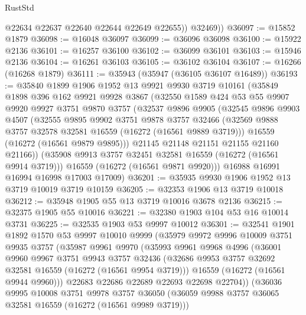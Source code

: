 \begin{lexlean}{RustStd}
\begin{coremodule}
            @22634
            @22637
            @22640
            @22644
            @22649
            @22655))
        @32469))
@36097 := @15852 @1879
@36098 := @16048 @36097
@36099 := @36096 @36098
@36100 := @15922 @2136
@36101 := @16257 @36100
@36102 := @36099 @36101
@36103 := @15946 @2136
@36104 := @16261 @36103
@36105 := @36102 @36104
@36107 := @16266 (@16268 @1879)
@36111 := @35943 (@35947 (@36105 @36107 @16489))
@36193 := @35840
    @1899
    @1906
    @1952
    @13
    @9921
    @9930
    @3719
    @10161
    (@35849
      @1898
      @396
      @162
      @9921
      @9928
      @3867
      (@32550
        @1589
        @424
        @53
        @55
        @9907
        @9920
        @9927
        @3751
        @9870
        @3757
        (@32537
          @9896
          @9905
          (@32545
            @9896
            @9903
            @4507
            (@32555
              @9895
              @9902
              @3751
              @9878
              @3757
              @32466
              (@32569 @9888 @3757 @32578 @32581 @16559 (@16272 (@16561 @9889 @3719)))
              @16559
              (@16272 (@16561 @9879 @9895)))
            @21145
            @21148
            @21151
            @21155
            @21160
            @21166))
        (@35908 @9913 @3757 @32451 @32581 @16559 (@16272 (@16561 @9914 @3719)))
        @16559
        (@16272 (@16561 @9871 @9920)))
      @16988
      @16991
      @16994
      @16998
      @17003
      @17009)
@36201 := @35935 @9930 @1906 @1952 @13 @3719 @10019 @3719 @10159
@36205 := @32353 @1906 @13 @3719 @10018
@36212 := @35948 @1905 @55 @13 @3719 @10016 @3678 @2136
@36215 := @32375 @1905 @55 @10016
@36221 := @32380 @1903 @104 @53 @16 @10014 @3731
@36225 := @32535 @1903 @53 @9997 @10012
@36301 := @32541
    @1901
    @1892
    @1570
    @53
    @9997
    @10010
    @9999
    (@35979
      @9972
      @9996
      @10009
      @3751
      @9935
      @3757
      (@35987
        @9961
        @9970
        (@35993
          @9961
          @9968
          @4996
          (@36001
            @9960
            @9967
            @3751
            @9943
            @3757
            @32436
            (@32686 @9953 @3757 @32692 @32581 @16559 (@16272 (@16561 @9954 @3719)))
            @16559
            (@16272 (@16561 @9944 @9960)))
          @22683
          @22686
          @22689
          @22693
          @22698
          @22704))
      (@36036
        @9995
        @10008
        @3751
        @9978
        @3757
        @36050
        (@36059 @9988 @3757 @36065 @32581 @16559 (@16272 (@16561 @9989 @3719)))

\end{coremodule}
\end{lexlean}
